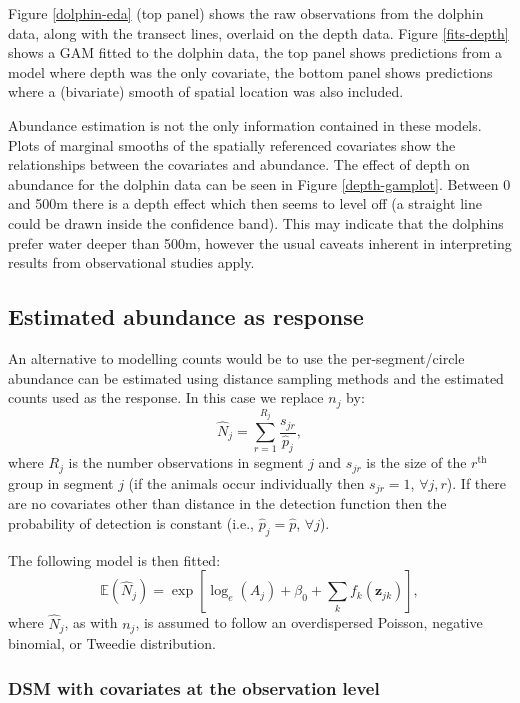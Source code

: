 \documentclass[a4paper,12pt]{article}
\begin{document}
Figure \ref{dolphin-eda} (top panel) shows the raw observations from the dolphin data, along with the transect lines, overlaid on the depth data. Figure \ref{fits-depth} shows a GAM fitted to the dolphin data, the top panel shows predictions from a model where depth was the only covariate, the bottom panel shows predictions where a (bivariate) smooth of spatial location was also included. 

Abundance estimation is not the only information contained in these models. Plots of marginal smooths of the spatially referenced covariates show the relationships between the covariates and abundance. The effect of depth on abundance for the dolphin data can be seen in Figure \ref{depth-gamplot}. Between 0 and 500m there is a depth effect which then seems to level off (a straight line could be drawn inside the confidence band). This may indicate that the dolphins prefer water deeper than 500m, however the usual caveats inherent in interpreting results from observational studies apply.


\subsection*{Estimated abundance as response}

An alternative to modelling counts would be to use the per-segment/circle abundance can be estimated using distance sampling methods and the estimated counts used as the response. In this case we replace $n_j$ by:
\begin{equation*}
\hat{N}_j = \sum_{r=1}^{R_j} \frac{s_{jr}}{\hat{p}_j},
\end{equation*}
where $R_j$ is the number observations in segment $j$ and $s_{jr}$ is the size of the $r^\text{th}$ group in segment $j$ (if the animals occur individually then $s_{jr}=1$, $\forall j,r$). If there are no covariates other than distance in the detection function then the probability of detection is constant (i.e., $\hat{p}_j=\hat{p}$, $\forall j$).

The following model is then fitted:
\begin{equation*}
\mathbb{E}(\hat{N}_j) = \exp\left[ \log_e \left( A_j \right) + \beta_0 + \sum_k f_k\left(\bm{z}_{jk}\right) \right],
\end{equation*}
where $\hat{N}_j$, as with $n_j$, is assumed to follow an overdispersed Poisson, negative binomial, or Tweedie distribution.

\subsubsection*{DSM with covariates at the observation level}
\end{document}
